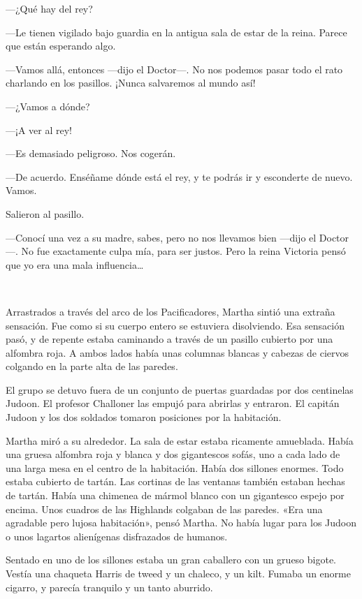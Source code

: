 ---¿Qué hay del rey?

---Le tienen vigilado bajo guardia en la antigua sala de estar de la
reina. Parece que están esperando algo.

---Vamos allá, entonces ---dijo el Doctor---. No nos podemos pasar todo
el rato charlando en los pasillos. ¡Nunca salvaremos al mundo así!

---¿Vamos a dónde?

---¡A ver al rey!

---Es demasiado peligroso. Nos cogerán.

---De acuerdo. Enséñame dónde está el rey, y te podrás ir y esconderte
de nuevo. Vamos.

Salieron al pasillo.

---Conocí una vez a su madre, sabes, pero no nos llevamos bien ---dijo
el Doctor---. No fue exactamente culpa mía, para ser justos. Pero la
reina Victoria pensó que yo era una mala influencia\ldots{}

~

Arrastrados a través del arco de los Pacificadores, Martha sintió una
extraña sensación. Fue como si su cuerpo entero se estuviera
disolviendo. Esa sensación pasó, y de repente estaba caminando a través
de un pasillo cubierto por una alfombra roja. A ambos lados había unas
columnas blancas y cabezas de ciervos colgando en la parte alta de las
paredes.

El grupo se detuvo fuera de un conjunto de puertas guardadas por dos
centinelas Judoon. El profesor Challoner las empujó para abrirlas y
entraron. El capitán Judoon y los dos soldados tomaron posiciones por la
habitación.

Martha miró a su alrededor. La sala de estar estaba ricamente amueblada.
Había una gruesa alfombra roja y blanca y dos gigantescos sofás, uno a
cada lado de una larga mesa en el centro de la habitación. Había dos
sillones enormes. Todo estaba cubierto de tartán. Las cortinas de las
ventanas también estaban hechas de tartán. Había una chimenea de mármol
blanco con un gigantesco espejo por encima. Unos cuadros de las
Highlands colgaban de las paredes. «Era una agradable pero lujosa
habitación», pensó Martha. No había lugar para los Judoon o unos
lagartos alienígenas disfrazados de humanos.

Sentado en uno de los sillones estaba un gran caballero con un grueso
bigote. Vestía una chaqueta Harris de tweed y un chaleco, y un kilt.
Fumaba un enorme cigarro, y parecía tranquilo y un tanto aburrido.

